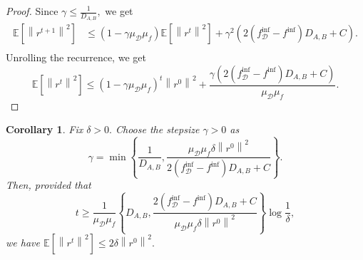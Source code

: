 \documentclass{article}
\newcommand{\bb}{\mathbb}
\newcommand{\Exp}[1]{{\bb E}\left[#1\right]}
\theoremstyle{plain}
\newtheorem{corollary}{Corollary}
\newcommand{\tf}{f_{\mathcal{D}}}
\theoremstyle{plain}
\theoremstyle{definition}
\theoremstyle{remark}
\begin{document}
\begin{proof}
Since $\gamma \leq \frac{1}{D_{A,B}},$ we get
\begin{equation*}
	\begin{split}
		\Exp{\left\|r^{t+1}\right\|^2} & \leq \left(1-\gamma\mu_{\mathcal{D}}\mu_f\right)\Exp{\left\|r^{t}\right\|^2}
		+ \gamma^2\left(2\left(\tf^{\inf} - f^{\inf}\right)D_{A,B}+C\right).\\
	\end{split}
\end{equation*}
Unrolling the recurrence, we get
\begin{equation*}
	\Exp{\left\|r^{t}\right\|^2} \leq \left(1-\gamma\mu_{\mathcal{D}}\mu_f\right)^t\left\|r^0\right\|^2 + \frac{\gamma\left(2\left(\tf^{\inf} - f^{\inf}\right)D_{A,B}+C\right)}{\mu_{\mathcal{D}}\mu_f}.
\end{equation*}
\end{proof}
\begin{corollary}
	Fix $\delta > 0.$ Choose the stepsize $\gamma>0$ as
	\begin{equation*}
		\gamma = \min\left\lbrace \frac{1}{D_{A,B}}, \frac{\mu_{\mathcal{D}}\mu_f\delta\left\|r^0\right\|^2}{2\left(\tf^{\inf} - f^{\inf}\right)D_{A,B}+C}\right\rbrace.
	\end{equation*}
	Then, provided that
	\begin{equation*}
		t \geq \frac{1}{\mu_{\mathcal{D}}\mu_f}\left\lbrace D_{A,B}, \frac{2\left(\tf^{\inf} - f^{\inf}\right)D_{A,B}+C}{\mu_{\mathcal{D}}\mu_f\delta\left\|r^0\right\|^2}\right\rbrace \log\frac{1}{\delta},
	\end{equation*}
	we have $\Exp{\left\|r^{t}\right\|^2} \leq 2\delta\left\|r^0\right\|^2.$
\end{corollary}
\end{document}
